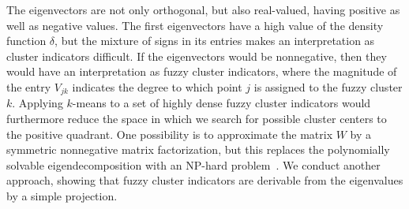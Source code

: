 The eigenvectors are not only orthogonal, but also real-valued, having positive as well as negative values. The first eigenvectors have a high value of the density function $\delta$, but the mixture of signs in its entries makes an interpretation as cluster indicators difficult. If the eigenvectors would be nonnegative, then they would have an interpretation as fuzzy cluster indicators, where the magnitude of the entry $V_{jk}$ indicates the degree to which point $j$ is assigned to the fuzzy cluster $k$. Applying $k$-means to a set of highly dense fuzzy cluster indicators would furthermore reduce the space in which we search for possible cluster centers to the positive quadrant. One possibility is to approximate the matrix $W$ by a symmetric nonnegative matrix factorization, but this replaces the polynomially solvable eigendecomposition with an NP-hard problem~\citep{vavasis2009complexity}. 
We conduct another approach, showing that fuzzy cluster indicators are derivable from the eigenvalues by a simple projection.

